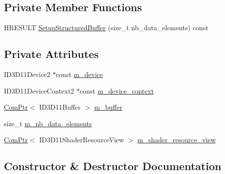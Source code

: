 \subsection*{Private Member Functions}
\begin{DoxyCompactItemize}
\item 
H\+R\+E\+S\+U\+LT \hyperlink{structmage_1_1_structured_buffer_a087801ae0e825bdc6a87f6c2c0f91a3f}{Setup\+Structured\+Buffer} (size\+\_\+t nb\+\_\+data\+\_\+elements) const
\end{DoxyCompactItemize}
\subsection*{Private Attributes}
\begin{DoxyCompactItemize}
\item 
I\+D3\+D11\+Device2 $\ast$const \hyperlink{structmage_1_1_structured_buffer_ab1ad27b8053f9631f0a74b9e90aa7d3d}{m\+\_\+device}
\item 
I\+D3\+D11\+Device\+Context2 $\ast$const \hyperlink{structmage_1_1_structured_buffer_a1bdf6ee33d3d53bfd3d5f6191fdbc351}{m\+\_\+device\+\_\+context}
\item 
\hyperlink{namespacemage_ae74f374780900893caa5555d1031fd79}{Com\+Ptr}$<$ I\+D3\+D11\+Buffer $>$ \hyperlink{structmage_1_1_structured_buffer_adbd113ab2fe539e34587887876fe3825}{m\+\_\+buffer}
\item 
size\+\_\+t \hyperlink{structmage_1_1_structured_buffer_a92c53203287f6ef5ab8ed88c7b588e72}{m\+\_\+nb\+\_\+data\+\_\+elements}
\item 
\hyperlink{namespacemage_ae74f374780900893caa5555d1031fd79}{Com\+Ptr}$<$ I\+D3\+D11\+Shader\+Resource\+View $>$ \hyperlink{structmage_1_1_structured_buffer_aa7a7c6da909ae8bed3c408f672a68377}{m\+\_\+shader\+\_\+resource\+\_\+view}
\end{DoxyCompactItemize}


\subsection{Constructor \& Destructor Documentation}
\hypertarget{structmage_1_1_structured_buffer_a9ba747c0666b96c17e3711266ee74aa0}{}\label{structmage_1_1_structured_buffer_a9ba747c0666b96c17e3711266ee74aa0} 
